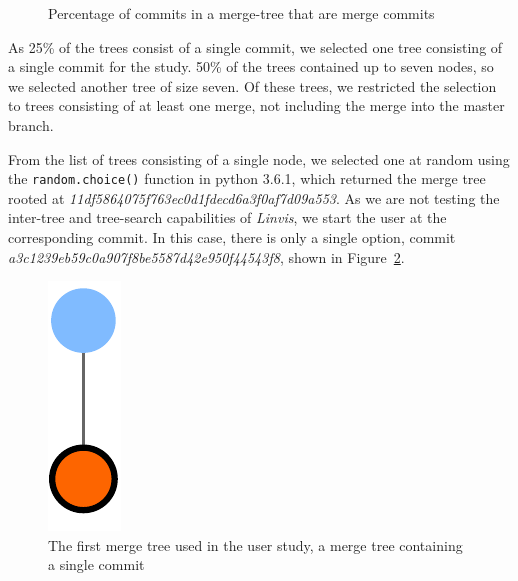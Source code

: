 \begin{figure}[htpb]
  \centering
  \caption{Percentage of commits in a merge-tree that are merge commits}
  \label{fig:percentage_filter}
\end{figure}

As 25\% of the trees consist of a single commit, we selected one tree
consisting of a single commit for the study. 50\% of the trees contained
up to seven nodes, so we selected another tree of size seven.  Of these
trees, we restricted the selection to trees consisting of at least one
merge, not including the merge into the master branch.

From the list of trees consisting of a single node, we selected one at
random using the \verb|random.choice()| function in python 3.6.1, which
returned the merge tree rooted at
\emph{11df5864075f763ec0d1fdecd6a3f0af7d09a553}. As we are not testing
the inter-tree and tree-search capabilities of \emph{Linvis}, we start
the user at the corresponding commit. In this case, there is only a
single option, commit \emph{a3c1239eb59c0a907f8be5587d42e950f44543f8},
shown in Figure~\ref{fig:commit_1}.

\begin{figure}[htpb]
  \centering
  \includegraphics[width=0.2\linewidth]{figures/commits/1-commit.pdf}
  \caption{The first merge tree used in the user study, a merge tree
    containing a single commit}
  \label{fig:commit_1}
\end{figure}

